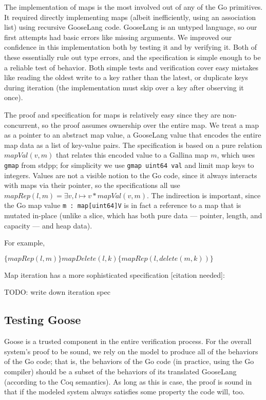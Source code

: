The implementation of maps is the most involved out of any of the Go
primitives. It required directly implementing maps (albeit
inefficiently, using an association list) using recursive GooseLang
code. GooseLang is an untyped language, so our first attempts had basic
errors like missing arguments. We improved our confidence in this
implementation both by testing it and by verifying it. Both of these
essentially rule out type errors, and the specification is simple enough
to be a reliable test of behavior. Both simple tests and verification
cover easy mistakes like reading the oldest write to a key rather than
the latest, or duplicate keys during iteration (the implementation must
skip over a key after observing it once).

The proof and specification for maps is relatively easy since they are
non-concurrent, so the proof assumes ownership over the entire map. We
treat a map as a pointer to an abstract map value, a GooseLang value
that encodes the entire map data as a list of key-value pairs. The
specification is based on a pure relation \(mapVal(v, m)\) that relates
this encoded value to a Gallina map \(m\), which uses \texttt{gmap} from
stdpp; for simplicity we use \texttt{gmap\ uint64\ val} and limit map
keys to integers. Values are not a visible notion to the Go code, since
it always interacts with maps via their pointer, so the specifications
all use \(mapRep(l, m) = \exists v, l \mapsto v * mapVal(v, m)\). The
indirection is important, since the Go map value
\texttt{m\ :\ map{[}uint64{]}V} is in fact a reference to a map that is
mutated in-place (unlike a slice, which has both pure data --- pointer,
length, and capacity --- and heap data).

For example,

\(\{mapRep(l, m)\} mapDelete(l, k) \{mapRep(l, delete(m, k))\}\)

Map iteration has a more sophisticated specification {[}citation
needed{]}:

TODO: write down iteration spec

\hypertarget{testing-goose}{%
\subsection{Testing Goose}\label{testing-goose}}

Goose is a trusted component in the entire verification process. For the
overall system's proof to be sound, we rely on the model to produce all
of the behaviors of the Go code; that is, the behaviors of the Go code
(in practice, using the Go compiler) should be a subset of the behaviors
of its translated GooseLang (according to the Coq semantics). As long as
this is case, the proof is sound in that if the modeled system always
satisfies some property the code will, too.

